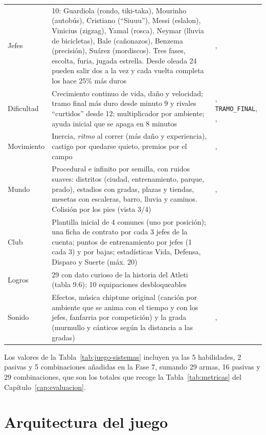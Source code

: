 \begin{longtable}{@{}L{2.2cm} L{5.8cm} L{3.0cm}@{}}
Jefes & 10: Guardiola (rondo, tiki-taka), Mourinho (autobús), Cristiano (``Siuuu''), Messi (eslalon), Vinicius (zigzag), Yamal (rosca), Neymar (lluvia de bicicletas), Bale (cañonazos), Benzema (precisión), Suárez (mordiscos). Tres fases, escolta, furia, jugada estrella. Desde oleada 24 pueden salir dos a la vez y cada vuelta completa los hace 25\% más duros & ,  \\
Dificultad & Crecimiento continuo de vida, daño y velocidad; tramo final más duro desde minuto 9 y rivales ``curtidos'' desde 12; multiplicador por ambiente; ayuda inicial que se apaga en 8 minutos & , \texttt{TRAMO\_FINAL}, ,  \\
Movimiento & Inercia, \textit{ritmo} al correr (más daño y experiencia), castigo por quedarse quieto, premios por el campo & ,  \\
Mundo & Procedural e infinito por semilla, con ruidos suaves: distritos (ciudad, entrenamiento, parque, prado), estadios con gradas, plazas y tiendas, mesetas con escaleras, barro, lluvia y caminos. Colisión por los pies (vista 3/4) & ,  \\
Club & Plantilla inicial de 4 comunes (uno por posición); una ficha de contrato por cada 3 jefes de la cuenta; puntos de entrenamiento por jefes (1 cada 3) y por bajas; estadísticas Vida, Defensa, Disparo y Suerte (máx. 20) &  \\
Logros & 29 con dato curioso de la historia del Atleti (tabla 9.6); 10 equipaciones desbloqueables &  \\
Sonido & Efectos, música chiptune original (canción por ambiente que se anima con el tiempo y con los jefes, fanfarria por competición) y la grada (murmullo y cánticos según la distancia a las gradas) & ,  \\*
\bottomrule
\end{longtable}

Los valores de la Tabla~\ref{tab:juego-sistemas} incluyen ya las 5 habilidades, 2 pasivas y 5 combinaciones añadidas en la Fase 7, sumando 29 armas, 16 pasivas y 29 combinaciones, que son los totales que recoge la Tabla~\ref{tab:metricas} del Capítulo~\ref{cap:evaluacion}.

\section{Arquitectura del juego}
\label{sec:juego-arquitectura}

